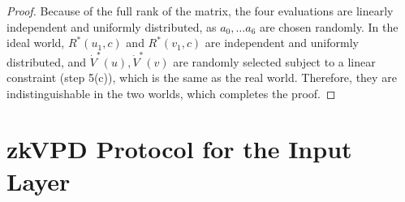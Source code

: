 \begin{proof}
Because of the full rank of the matrix, the four evaluations are linearly independent and uniformly distributed, as $a_0,\ldots a_6$ are chosen randomly. In the ideal world, $R^*(u_1,c)$ and $R^*(v_1,c)$ are independent and uniformly distributed, and $\dot{V}^*(u), \dot{V}^*(v)$ are randomly selected subject to a linear constraint (step 5(c)), which is the same as the real world. Therefore, they are indistinguishable in the two worlds, which completes the proof.   



\end{proof}


\section{zkVPD Protocol for the Input Layer}\label{app:zkvpdconstruction}

